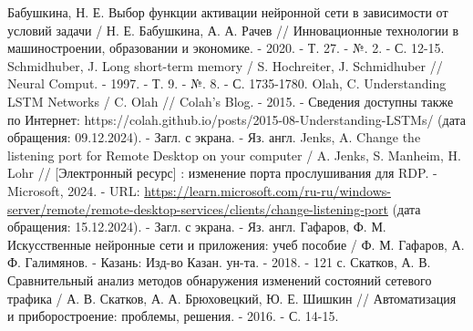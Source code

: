 \documentclass[spec, och, diploma]{SCWorks}
\begin{document}
\begin{thebibliography}{25}
    Бабушкина, Н. Е. Выбор функции активации нейронной сети в зависимости от условий задачи / Н. Е. Бабушкина, А. А. Рачев // Инновационные технологии в 
    машиностроении, образовании и экономике. - 2020. - Т. 27. - №. 2. - С. 12-15.
    Schmidhuber, J. Long short-term memory / S. Hochreiter, J. Schmidhuber // Neural Comput. - 1997. - Т. 9. - №. 8. - С. 1735-1780.
    Olah, C. Understanding LSTM Networks / C. Olah // Colah's Blog. - 2015. - Сведения доступны также по Интернет: https://colah.github.io/posts/2015-08-Understanding-LSTMs/ (дата обращения: 09.12.2024). - Загл. с экрана. - Яз. англ.
    Jenks, A. Change the listening port for Remote Desktop on your computer / A. Jenks, S. Manheim, H. Lohr // [Электронный ресурс] : изменение порта прослушивания для RDP. - Microsoft, 2024. - URL: \url{https://learn.microsoft.com/ru-ru/windows-server/remote/remote-desktop-services/clients/change-listening-port} (дата обращения: 15.12.2024). - Загл. с экрана. - Яз. англ.
    Гафаров, Ф. М. Искусственные нейронные сети и приложения: учеб пособие / Ф. М. Гафаров, А. Ф. Галимянов. - Казань: Изд-во Казан. ун-та. - 2018. - 121 с.
    Скатков, А. В. Сравнительный анализ методов обнаружения изменений состояний сетевого трафика / А. В. Скатков, А. А. Брюховецкий, Ю. Е. Шишкин //
    Автоматизация и приборостроение: проблемы, решения. - 2016. - С. 14-15.

  \end{thebibliography}
\end{document}
